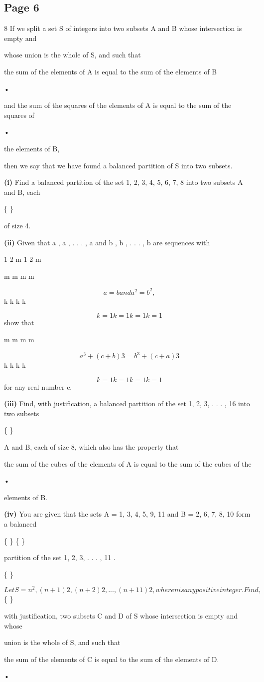\documentclass[12pt]{article}
\begin{document}
\subsection*{Page 6}
\begin{flushleft}
8 If we split a set S of integers into two subsets A and B whose intersection is empty and\par
whose union is the whole of S, and such that\par
the sum of the elements of A is equal to the sum of the elements of B\par
•\par
and the sum of the squares of the elements of A is equal to the sum of the squares of\par
•\par
the elements of B,\par
then we say that we have found a balanced partition of S into two subsets.\par
\textbf{(i)} Find a balanced partition of the set 1, 2, 3, 4, 5, 6, 7, 8 into two subsets A and B, each\par
\{ \}\par
of size 4.\par
\textbf{(ii)} Given that a , a , . . . , a and b , b , . . . , b are sequences with\par
1 2 m 1 2 m\par
m m m m\par
\[a = b and a^2 = b^2,\]
k k k k\par
\[k=1 k=1 k=1 k=1\]
show that\par
m m m m\par
\[a^3 + (c + b )3 = b^3 + (c + a )3\]
k k k k\par
\[k=1 k=1 k=1 k=1\]
for any real number c.\par
\textbf{(iii)} Find, with justification, a balanced partition of the set 1, 2, 3, . . . , 16 into two subsets\par
\{ \}\par
A and B, each of size 8, which also has the property that\par
the sum of the cubes of the elements of A is equal to the sum of the cubes of the\par
•\par
elements of B.\par
\textbf{(iv)} You are given that the sets A = 1, 3, 4, 5, 9, 11 and B = 2, 6, 7, 8, 10 form a balanced\par
\{ \} \{ \}\par
partition of the set 1, 2, 3, . . . , 11 .\par
\{ \}\par
\[Let S = n^2, (n + 1)2, (n + 2)2, . . . , (n + 11)2 , where n is any positive integer. Find,\]
\{ \}\par
with justification, two subsets C and D of S whose intersection is empty and whose\par
union is the whole of S, and such that\par
the sum of the elements of C is equal to the sum of the elements of D.\par
•\par
\end{flushleft}
\end{document}
